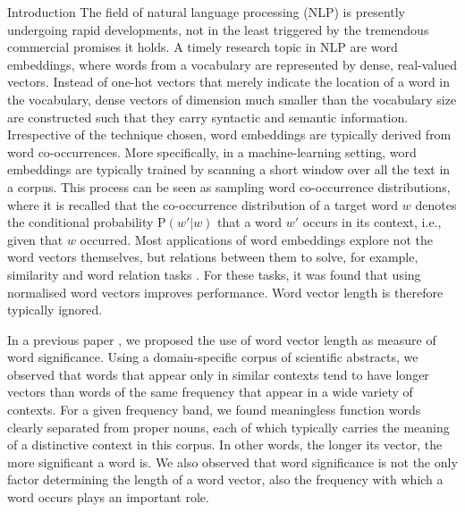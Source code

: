 \documentclass{article} %
\newcommand{\p}{\mathrm{P}}
\begin{document}
\begin{section}{Introduction}
The field of natural language processing (NLP) is presently undergoing rapid
developments, not in the least triggered by the tremendous commercial
promises it holds.  A timely research topic in NLP are word embeddings,
where words from a vocabulary are represented by dense, real-valued
vectors.  Instead of one-hot vectors that merely indicate the location
of a word in the vocabulary, dense
vectors of dimension much smaller than the vocabulary size are
constructed such that they carry syntactic and semantic information.
Irrespective of the technique chosen, word embeddings are
typically derived from word co-occurrences.  More specifically, in a
machine-learning setting, word embeddings are typically trained by
scanning a short window over all the text in a corpus.  This process can
be seen as sampling word co-occurrence distributions, where it is
recalled that the co-occurrence distribution of a target word $w$
denotes the conditional probability $\p(w'|w)$ that a word $w'$ occurs in
its context, i.e., given that $w$ occurred.  Most applications of word
embeddings explore not the word vectors themselves, but relations
between them to solve, for example, similarity and word relation tasks
\cite{vecchi-baroni-zamparelli2011}.  For these tasks, it was found that using normalised word
vectors improves performance.  Word vector length is therefore typically
ignored.

In a previous paper \cite{schakel-wilson}, we proposed the use of word
vector length as measure of word significance.  Using a domain-specific
corpus of scientific abstracts, we observed that words that appear only
in similar contexts tend to have longer vectors than words of the same
frequency that appear in a wide variety of contexts.  For a given
frequency band, we found meaningless function words clearly separated
from proper nouns, each of which typically carries the meaning of a
distinctive context in this corpus.  In other words, the longer its
vector, the more significant a word is.  We also observed that word
significance is not the only factor determining the length of a word
vector, also the frequency with which a word occurs plays an important
role.


\end{section}
\end{document}

